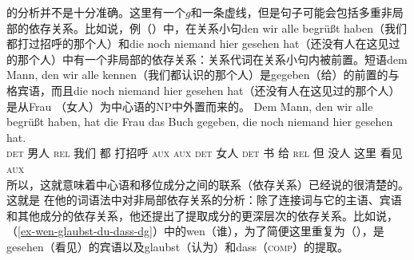  \citet{GO2009a}的分析并不是十分准确。这里有一个$g$和一条虚线，但是句子可能会包括多重非局部的依存关系。比如说，例（）中，在关系小句den wir alle begrüßt haben（我们都打过招呼的那个人）和die noch niemand hier
  gesehen hat（还没有人在这见过的那个人）中有一个非局部的依存关系：关系代词在关系小句内被前置。短语dem Mann, den wir alle kennen（我们都认识的那个人）是gegeben（给）的前置的与格宾语，而且die noch niemand hier gesehen
  hat（还没有人在这见过的那个人）是从Frau （女人）为中心语的NP中外置而来的。
\ea
\gll Dem Mann, den wir alle begrüßt haben, hat die Frau das Buch gegeben, die noch niemand hier gesehen hat.\\
     \textsc{det} 男人  \textsc{rel} 我们 都 打招呼 \textsc{aux}      \textsc{aux} \textsc{det} 女人 \textsc{det} 书 给 \textsc{rel} 但 没人 这里 看见 \textsc{aux}\\
\z
所以，这就意味着中心语和移位成分之间的联系（依存关系）已经说的很清楚的。这就是 \citet{Hudson97a,Hudson2000a}在他的词语法中对非局部依存关系的分析：除了连接词与它的主语、宾语和其他成分的依存关系，他还提出了提取成分的更深层次的依存关系。比如说，（\ref{ex-wen-glaubst-du-dass-dg}）中的wen（谁），为了简便这里重复为（），是gesehen（看见）的宾语以及glaubst（认为）和dass（\textsc{comp}）的提取。

